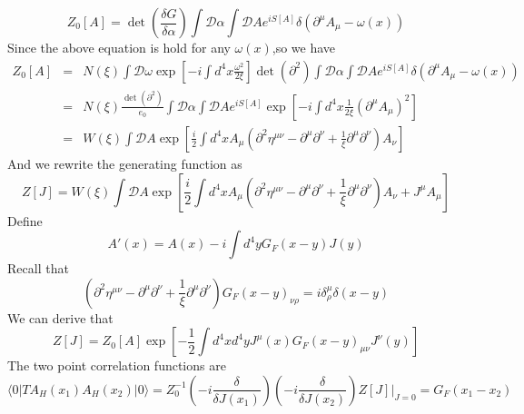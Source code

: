\[Z_0[A] = \det \left( \frac{\delta G}{\delta \alpha} \right) \int \mathcal{D}\alpha \int \mathcal{D}A e^{iS[A]} \delta(\partial^{\mu}A_{\mu} - \omega(x))\]
Since the above equation is hold for any $\omega(x)$,so we have
\begin{eqnarray}
Z_0[A] &=& N(\xi) \int \mathcal{D}\omega \exp\left[ -i \int d^4x \frac{\omega^2}{2\xi} \right] \det(\partial^2) \int \mathcal{D}\alpha \int \mathcal{D}A e^{iS[A]} \delta(\partial^{\mu}A_{\mu} - \omega(x)) \nonumber \\
&=& N(\xi) \frac{\det(\partial^2)}{e_0} \int \mathcal{D}\alpha \int \mathcal{D}A e^{iS[A]} \exp\left[ -i \int d^4x \frac{1}{2\xi} (\partial^{\mu}A_{\mu})^2\right] \nonumber \\
&=& W(\xi) \int \mathcal{D}A \exp\left[ \frac{i}{2} \int d^4x  A_{\mu} (\partial^2\eta^{\mu\nu} - \partial^{\mu}\partial^{\nu} + \frac{1}{\xi} \partial^{\mu} \partial^{\nu})A_{\nu}\right] \nonumber
\end{eqnarray}
And we rewrite the generating function as
\[Z[J] = W(\xi) \int \mathcal{D}A \exp\left[ \frac{i}{2} \int d^4x  A_{\mu} (\partial^2\eta^{\mu\nu} - \partial^{\mu}\partial^{\nu} + \frac{1}{\xi} \partial^{\mu} \partial^{\nu})A_{\nu} + J^{\mu} A_{\mu}\right]\]
Define
\[A'(x) = A(x) - i \int d^4y G_F(x-y)J(y)\]
Recall that
\[(\partial^2\eta^{\mu\nu} - \partial^{\mu}\partial^{\nu} + \frac{1}{\xi} \partial^{\mu} \partial^{\nu})G_F(x-y)_{\nu \rho} = i\delta^{\mu}_{\rho}\delta(x-y)\]
We can derive that
\[Z[J]=Z_0[A] \exp \left[ -\frac{1}{2} \int d^4x d^4y J^{\mu}(x) G_F(x-y)_{\mu\nu}J^{\nu}(y) \right]\]
The two point correlation functions are
\[\langle 0 | T A_H(x_1) A_H(x_2)| 0 \rangle = Z_0^{-1} \left(-i \frac{\delta}{\delta J(x_1)} \right) \left(-i \frac{\delta}{\delta J(x_2)} \right) Z[J]\bigg|_{J=0} = G_F(x_1-x_2) \]


